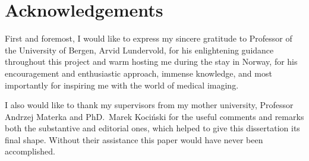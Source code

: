 \chapter*{Acknowledgements}

\thispagestyle{empty}

 \label{sec:acknowledgements}
	
First and foremost, I would like to express my sincere gratitude to Professor of the University of Bergen, Arvid Lundervold, for his enlightening guidance throughout this project and warm hosting me during the stay in Norway, for his encouragement and enthusiastic approach, immense knowledge, and most importantly for inspiring me with the world of medical imaging.

I also would like to thank my supervisors from my mother university, Professor Andrzej Materka and PhD.~Marek Kociński for the useful comments and remarks both the substantive and editorial ones, which helped to give this dissertation its final shape. Without their assistance this paper would have never been accomplished.

\newpage
\thispagestyle{empty}
\mbox{}